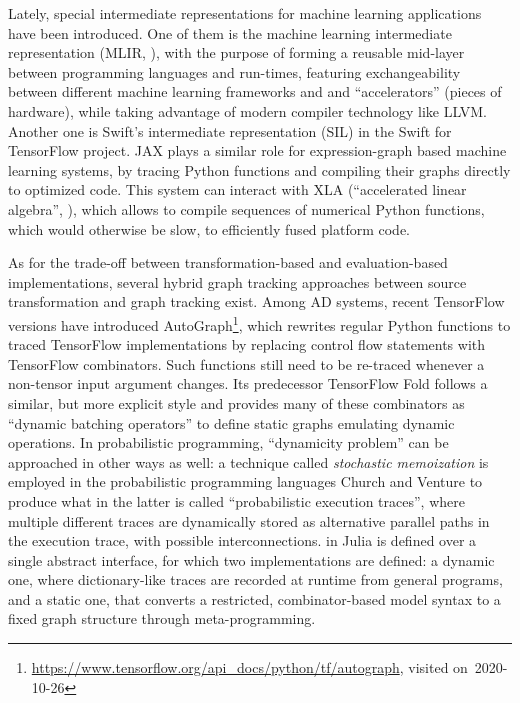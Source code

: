 Lately, special intermediate representations for machine learning applications have been introduced.
One of them is the machine learning intermediate representation (MLIR, \textcite{lattner2020mlir}),
with the purpose of forming a reusable mid-layer between programming languages and run-times,
featuring exchangeability between different machine learning frameworks and and
\enquote{accelerators} (pieces of hardware), while taking advantage of modern compiler technology
like LLVM.  Another one is Swift's intermediate representation (SIL) in the Swift for TensorFlow
project.  JAX \parencite{bradbury2018jax} plays a similar role for expression-graph based machine
learning systems, by tracing Python functions and compiling their graphs directly to optimized code.
This system can interact with XLA (\enquote{accelerated linear algebra},
\textcite{tensorflowdevelopers2020xla}), which allows to compile sequences of numerical Python
functions, which would otherwise be slow, to efficiently fused platform code.

As for the trade-off between transformation-based and evaluation-based implementations, several
hybrid graph tracking approaches between source transformation and graph tracking exist.  Among AD
systems, recent TensorFlow versions have introduced
AutoGraph\footnote{\url{https://www.tensorflow.org/api_docs/python/tf/autograph}, visited
  on~2020-10-26}, which rewrites regular Python functions to traced TensorFlow implementations by
replacing control flow statements with TensorFlow combinators.  Such functions still need to be
re-traced whenever a non-tensor input argument changes.  Its predecessor TensorFlow Fold
\parencite{looks2017deep} follows a similar, but more explicit style and provides many of these
combinators as \enquote{dynamic batching operators} to define static graphs emulating dynamic
operations.  In probabilistic programming, \enquote{dynamicity problem} can be approached in other
ways as well: a technique called \emph{stochastic memoization} is employed in the probabilistic
programming languages Church \parencite{goodman2012church} and Venture
\parencite{mansinghka2014venture} to produce what in the latter is called \enquote{probabilistic
  execution traces}, where multiple different traces are dynamically stored as alternative parallel
paths in the execution trace, with possible interconnections.  
\parencite{cusumano-towner2019gen,cusumano-towner2020gen} in Julia is defined over a single abstract
interface, for which two implementations are defined: a dynamic one, where dictionary-like traces
are recorded at runtime from general programs, and a static one, that converts a restricted,
combinator-based model syntax to a fixed graph structure through meta-programming.


